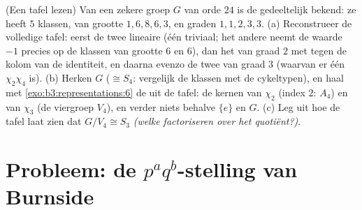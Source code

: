 \begin{exercise}[$\star\star$]\label{exo:b3:representations:12}
(Een tafel lezen) Van een zekere groep $G$ van orde $24$ is de
 gedeeltelijk bekend: ze heeft $5$ klassen, van
grootte $1, 6, 8, 6, 3$, en graden $1, 1, 2, 3, 3$.
(a) Reconstrueer de volledige tafel: eerst de twee lineaire
 (één triviaal; het andere neemt de waarde $-1$ precies
op de klassen van grootte $6$ en $6$), dan het  van graad
$2$ met  tegen de kolom van de identiteit, en
daarna evenzo de twee  van graad $3$ (waarvan er één
$\chi_2\chi_4$ is).
(b) Herken $G$ ($\cong S_4$: vergelijk de klassen met de
cykeltypen), en haal met \cref{exo:b3:representations:6} de
 uit de tafel: de kernen van $\chi_2$ (index $2$:
$A_4$) en van $\chi_3$ (de viergroep $V_4$), en verder niets
behalve $\{e\}$ en $G$.
(c) Leg uit hoe de tafel laat zien dat $G/V_4 \cong S_3$
\emph{(welke  factoriseren over het quotiënt?)}.
\end{exercise}

\section{Probleem: de \texorpdfstring{$p^aq^b$}{paqb}-stelling van
Burnside}

